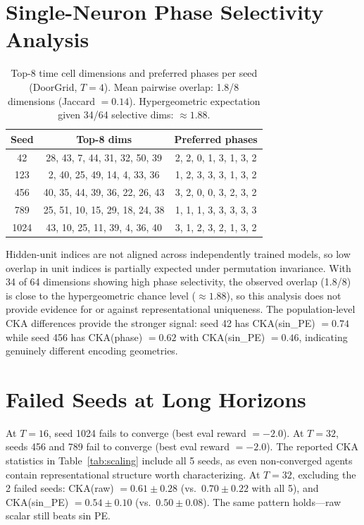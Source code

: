 \documentclass{article}
\begin{document}
\begin{appendices}

\section{Single-Neuron Phase Selectivity Analysis}
\label{app:neurons}

\begin{table}[h]
\centering
\caption{Top-8 time cell dimensions and preferred phases per seed (DoorGrid, $T = 4$).
Mean pairwise overlap: 1.8/8 dimensions (Jaccard $= 0.14$).
Hypergeometric expectation given 34/64 selective dims: $\approx 1.88$.}
\label{tab:tuning}
\begin{tabular}{ccc}
\toprule
\textbf{Seed} & \textbf{Top-8 dims} & \textbf{Preferred phases} \\
\midrule
42  & 28, 43, 7, 44, 31, 32, 50, 39 & 2, 2, 0, 1, 3, 1, 3, 2 \\
123 & 2, 40, 25, 49, 14, 4, 33, 36  & 1, 2, 3, 3, 3, 1, 3, 2 \\
456 & 40, 35, 44, 39, 36, 22, 26, 43 & 3, 2, 0, 0, 3, 2, 3, 2 \\
789 & 25, 51, 10, 15, 29, 18, 24, 38 & 1, 1, 1, 3, 3, 3, 3, 3 \\
1024 & 43, 10, 25, 11, 39, 4, 36, 40 & 3, 1, 2, 3, 2, 1, 3, 2 \\
\bottomrule
\end{tabular}
\end{table}

Hidden-unit indices are not aligned across independently trained models, so low overlap in unit indices is partially expected under permutation invariance.
With 34 of 64 dimensions showing high phase selectivity, the observed overlap (1.8/8) is close to the hypergeometric chance level ($\approx 1.88$), so this analysis does not provide evidence for or against representational uniqueness.
The population-level CKA differences provide the stronger signal: seed 42 has CKA(sin\_PE) $= 0.74$ while seed 456 has CKA(phase) $= 0.62$ with CKA(sin\_PE) $= 0.46$, indicating genuinely different encoding geometries.

\section{Failed Seeds at Long Horizons}
\label{app:failed}

At $T = 16$, seed 1024 fails to converge (best eval reward $= -2.0$).
At $T = 32$, seeds 456 and 789 fail to converge (best eval reward $= -2.0$).
The reported CKA statistics in Table~\ref{tab:scaling} include all 5 seeds, as even non-converged agents contain representational structure worth characterizing.
At $T = 32$, excluding the 2 failed seeds: CKA(raw) $= 0.61 \pm 0.28$ (vs.\ $0.70 \pm 0.22$ with all 5), and CKA(sin\_PE) $= 0.54 \pm 0.10$ (vs.\ $0.50 \pm 0.08$).
The same pattern holds---raw scalar still beats sin PE.

\end{appendices}
\end{document}

